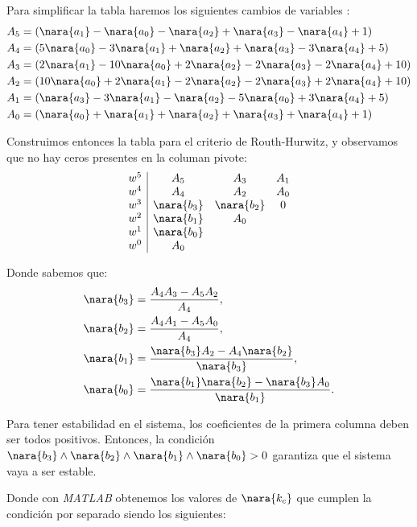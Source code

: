 Para simplificar la tabla haremos los siguientes cambios de variables :
\begin{align}
    A_5&= (\nara{a_1} - \nara{a_0} - \nara{a_2} + \nara{a_3} - \nara{a_4} + 1)\\
    A_4 &=(5\nara{a_0} - 3\nara{a_1} + \nara{a_2} + \nara{a_3} - 3\nara{a_4} + 5) \\
    A_3 &= (2\nara{a_1} - 10\nara{a_0} + 2\nara{a_2} - 2\nara{a_3} - 2\nara{a_4} + 10)\\
    A_2 &=(10\nara{a_0} + 2\nara{a_1} - 2\nara{a_2} - 2\nara{a_3} + 2\nara{a_4} + 10)\\
    A_1 &=(\nara{a_3} - 3\nara{a_1} - \nara{a_2} - 5\nara{a_0} + 3\nara{a_4} + 5)\\
    A_0 &= (\nara{a_0} + \nara{a_1} + \nara{a_2} + \nara{a_3} + \nara{a_4} + 1)
\end{align}

Construimos entonces la tabla para el criterio de Routh-Hurwitz, y observamos
que no hay ceros presentes en la columan pivote:
\begin{equation}
  \begin{array}{c|ccc}
    w^5 & A_5 & A_3& A_1 \\
    w^4 & A_4 & A_2 & A_0 \\
    w^3 & \nara{b_3}  &  \nara{b_2} &0\\
    w^2 & \nara{b_1}  & A_0\\
    w^1 & \nara{b_0}\\
    w^0 & A_0
  \end{array}
\end{equation}

Donde sabemos que:
\begin{align}
    \nara{b_3} &= \frac{A_4 A_3 - A_5 A_2}{A_4},\\ 
    \nara{b_2} &= \frac{A_4 A_1 - A_5 A_0}{A_4},\\ 
    \nara{b_1} &= \frac{\nara{b_3} A_2 - A_4 \nara{b_2}}{\nara{b_3}},\\ 
    \nara{b_0} &= \frac{\nara{b_1} \nara{b_2} - \nara{b_3} A_0}{\nara{b_1}}.
  \end{align}

Para tener estabilidad en el sistema, los coeficientes de la primera columna
deben ser todos positivos. Entonces, la condición $\nara{b_3} \land \nara{b_2} \land\nara{b_1}\land\nara{b_0}>0$ garantiza
que el sistema vaya a ser estable.

Donde con \textit{MATLAB} obtenemos los valores de $\nara{k_c}$ que cumplen la condición por separado siendo los siguientes:


